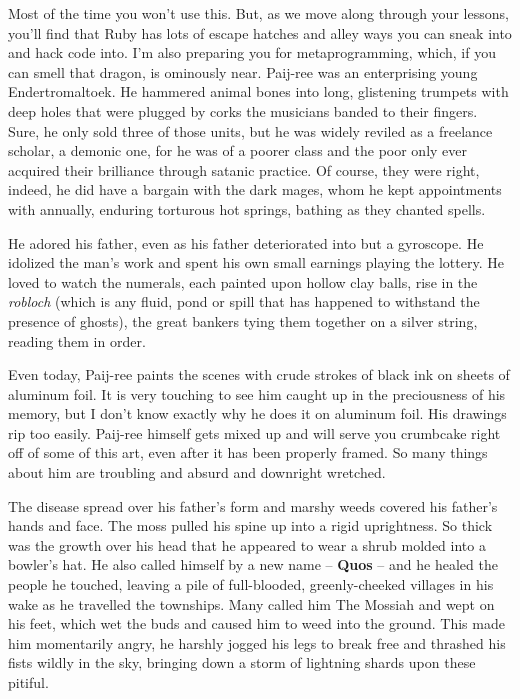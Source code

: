 \documentclass[12pt,twoside]{report}
\begin{document}
Most of the time you won't use this.  But, as we move along through
your lessons, you'll find that Ruby has lots of escape hatches and
alley ways you can sneak into and hack code into.  I'm also preparing
you for metaprogramming, which, if you can smell that dragon, is
ominously near.  Paij-ree was an enterprising young Endertromaltoek.
He hammered animal bones into long, glistening trumpets with deep
holes that were plugged by corks the musicians banded to their
fingers.  Sure, he only sold three of those units, but he was widely
reviled as a freelance scholar, a demonic one, for he was of a poorer
class and the poor only ever acquired their brilliance through satanic
practice.  Of course, they were right, indeed, he did have a bargain
with the dark mages, whom he kept appointments with annually, enduring
torturous hot springs, bathing as they chanted spells.

He adored his father, even as his father deteriorated into but a
gyroscope.  He idolized the man's work and spent his own small
earnings playing the lottery.  He loved to watch the numerals, each
painted upon hollow clay balls, rise in the {\em robloch} (which is
any fluid, pond or spill that has happened to withstand the presence
of ghosts), the great bankers tying them together on a silver string,
reading them in order.

Even today, Paij-ree paints the scenes with crude strokes of black ink
on sheets of aluminum foil.  It is very touching to see him caught up
in the preciousness of his memory, but I don't know exactly why he
does it on aluminum foil.  His drawings rip too easily.  Paij-ree
himself gets mixed up and will serve you crumbcake right off of some
of this art, even after it has been properly framed.  So many things
about him are troubling and absurd and downright wretched.

The disease spread over his father's form and marshy weeds covered his
father's hands and face.  The moss pulled his spine up into a rigid
uprightness.  So thick was the growth over his head that he appeared
to wear a shrub molded into a bowler's hat.  He also called himself by
a new name -- {\bf Quos} -- and he healed the people he touched,
leaving a pile of full-blooded, greenly-cheeked villages in his wake
as he travelled the townships.  Many called him The Mossiah and wept
on his feet, which wet the buds and caused him to weed into the
ground.  This made him momentarily angry, he harshly jogged his legs
to break free and thrashed his fists wildly in the sky, bringing down
a storm of lightning shards upon these pitiful.
\end{document}
